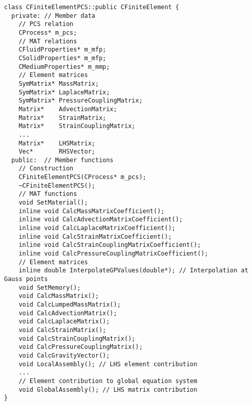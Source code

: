 \footnotesize
\begin{verbatim}
class CFiniteElementPCS::public CFiniteElement {
  private: // Member data
    // PCS relation
    CProcess* m_pcs;
    // MAT relations
    CFluidProperties* m_mfp;
    CSolidProperties* m_mfp;
    CMediumProperties* m_mmp;
    // Element matrices
    SymMatrix* MassMatrix;
    SymMatrix* LaplaceMatrix;
    SymMatrix* PressureCouplingMatrix;
    Matrix*    AdvectionMatrix;
    Matrix*    StrainMatrix;
    Matrix*    StrainCouplingMatrix;
    ...
    Matrix*    LHSMatrix;
    Vec*       RHSVector;
  public:  // Member functions
    // Construction
    CFiniteElementPCS(CProcess* m_pcs);
    ~CFiniteElementPCS();
    // MAT functions
    void SetMaterial();
    inline void CalcMassMatrixCoefficient();
    inline void CalcAdvectionMatrixCoefficient();
    inline void CalcLaplaceMatrixCoefficient();
    inline void CalcStrainMatrixCoefficient();
    inline void CalcStrainCouplingMatrixCoefficient();
    inline void CalcPressureCouplingMatrixCoefficient();
    // Element matrices
    inline double InterpolateGPValues(double*); // Interpolation at Gauss points
    void SetMemory();
    void CalcMassMatrix();
    void CalcLumpedMassMatrix();
    void CalcAdvectionMatrix();
    void CalcLaplaceMatrix();
    void CalcStrainMatrix();
    void CalcStrainCouplingMatrix();
    void CalcPressureCouplingMatrix();
    void CalcGravityVector();
    void LocalAssembly(); // LHS element contribution
    ...
    // Element contribution to global equation system
    void GlobalAssembly(); // LHS matrix contribution
}
\end{verbatim}
\normalfont\normalsize
